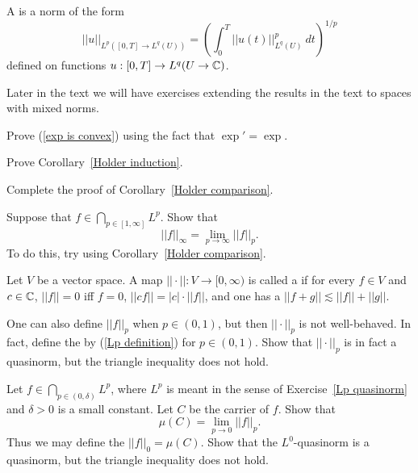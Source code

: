 \begin{definition}
A  is a norm of the form
\[||u||_{L^{p}([0, T] \to L^{q}(U))} = {\left(\int_{0}^{T} ||u(t)||_{L^{q}(U)}^{p}~dt\right)}^{1/p}\]
defined on functions $u: [0, T] \to L^{q}(U \to \mathbb{C})$.
\end{definition}

Later in the text we will have exercises extending the results in the text to spaces with mixed norms.

\begin{exercise}\label{exp is convex exer}
Prove (\ref{exp is convex}) using the fact that $\exp' = \exp$.
\end{exercise}

\begin{exercise}\label{Holder induction exer}
Prove Corollary~\ref{Holder induction}.
\end{exercise}

\begin{exercise}\label{granular comparison}
Complete the proof of Corollary~\ref{Holder comparison}.
\end{exercise}

\begin{exercise}
Suppose that $f \in \bigcap_{p \in [1, \infty]} L^{p}$. Show that
\[||f||_{\infty} = \lim_{p \to \infty} ||f||_{p} .\]
To do this, try using Corollary~\ref{Holder comparison}.
\end{exercise}

\begin{definition}
Let $V$ be a vector space.
A map $||\cdot||: V \to [0, \infty)$ is called a  if for every $f \in V$ and $c \in \mathbb{C}$, $||f|| = 0$ iff $f = 0$, $||cf|| = |c|\cdot||f||$, and one has a  $||f + g|| \lesssim ||f|| + ||g||$.
\end{definition}

\begin{exercise}\label{Lp quasinorm}
One can also define $||f||_{p} $ when $p \in (0, 1)$, but then $||\cdot||_{p} $ is not well-behaved.
In fact, define the  by (\ref{Lp definition}) for $p \in (0, 1)$.
Show that $||\cdot||_{p} $ is in fact a quasinorm, but the triangle inequality does not hold.
\end{exercise}

\begin{exercise}
Let $f \in \bigcap_{p \in (0, \delta)} L^{p}$, where $L^{p}$ is meant in the sense of Exercise~\ref{Lp quasinorm} and $\delta > 0$ is a small constant.
Let $C$ be the carrier of $f$. Show that
\[\mu(C) = \lim_{p \to 0} ||f||_{p} .\]
Thus we may define the  $||f||_{0} = \mu(C)$.
Show that the $L^{0}$-quasinorm is a quasinorm, but the triangle inequality does not hold.
\end{exercise}

